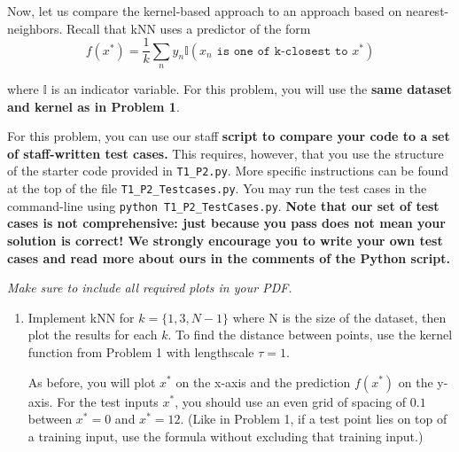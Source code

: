 \documentclass[submit]{harvardml}
\begin{document}
\newpage








\begin{problem}

Now, let us compare the kernel-based approach to an approach based on
nearest-neighbors.  Recall that kNN uses a predictor of the form
  \begin{equation*}
    f(x^*) = \frac{1}{k} \sum_n y_n \mathbb{I}(x_n \texttt{ is one of k-closest to } x^*)
  \end{equation*}

\noindent where $\mathbb{I}$ is an indicator variable. For this problem, you will use the \textbf{same dataset and kernel as in Problem 1}.


For this problem, you can use our staff \textbf{script to compare your code to a set of staff-written test cases.} This requires, however, that you use the structure of the starter code provided in \texttt{T1\_P2.py}. More specific instructions can be found at the top of the file \texttt{T1\_P2\_Testcases.py}. You may run the test cases in the command-line using \texttt{python T1\_P2\_TestCases.py}.
\textbf{Note that our set of test cases is not comprehensive: just because you pass does not mean your solution is correct! We strongly encourage you to write your own test cases and read more about ours in the comments of the Python script.}

\vspace{0.5cm}
\noindent\emph{Make sure to include all required plots in your PDF.}


\begin{enumerate}

\item Implement kNN for $k=\{1, 3, N-1\}$ where N is the size of the dataset, then plot the results for each $k$. To find the distance between points, use the kernel function from Problem 1 with lengthscale $\tau=1$. 

As before, you will plot $x^*$ on the x-axis and the prediction $f(x^*)$ on the y-axis.  For the test inputs $x^*$, you should use an even grid of spacing of $0.1$ between $x^* = 0$ and $x^* = 12$.  (Like in Problem 1, if a test point lies on top of a training input, use the formula without excluding that training input.)
  

\end{enumerate}
\end{problem}
\end{document}
